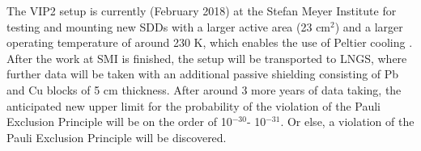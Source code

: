 The VIP2 setup is currently (February 2018) at the Stefan Meyer Institute for testing and mounting new SDDs with a larger active area (23 cm$^{2}$) and a larger operating temperature of around 230 K, which enables the use of Peltier cooling \cite{Pichler2017}. After the work at SMI is finished, the setup will be transported to LNGS, where further data will be taken with an additional passive shielding consisting of Pb and Cu blocks of 5 cm thickness. After around 3 more years of data taking, the anticipated new upper limit for the probability of the violation of the Pauli Exclusion Principle will be on the order of 10$^{-30}$- 10$^{-31}$. Or else, a violation of the Pauli Exclusion Principle will be discovered.


